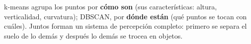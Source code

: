 \documentclass{article}
\begin{document}
\begin{tcolorbox}[colback=yellow!8!white, colframe=orange!70!black, title=\textbf{Para terminar}]
k-means agrupa los puntos por \textbf{cómo son} (sus características: altura, verticalidad, curvatura); DBSCAN, por \textbf{dónde están} (qué puntos se tocan con cuáles). Juntos forman un sistema de percepción completo: primero se separa el suelo de lo demás y después lo demás se trocea en objetos.
\end{tcolorbox}
\end{document}
